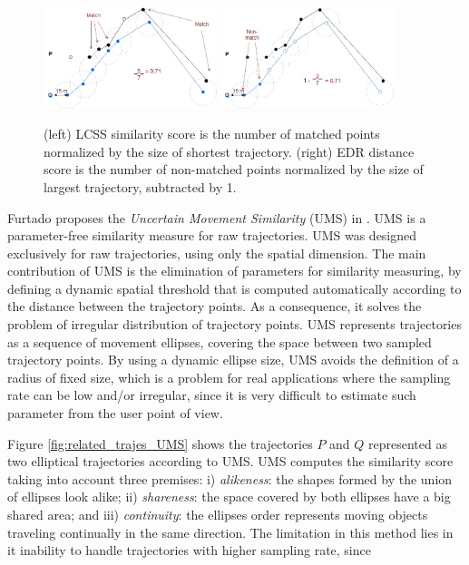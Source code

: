 \documentclass[12pt]{article}
\begin{document}
\begin{figure}[h]
\centering
\includegraphics[width=0.45\textwidth]{Related_Works/related_trajes-LCSS.jpg}
\includegraphics[width=0.45\textwidth]{Related_Works/related_trajes-EDR.jpg}
\caption{\label{fig:related_trajes_EDR_LCSS}(left) LCSS similarity score is the number of matched points normalized by the size of shortest trajectory. (right) EDR distance score is the number of non-matched points normalized by the size of largest trajectory, subtracted by 1.}
\end{figure}

Furtado proposes the \emph{Uncertain Movement Similarity} (UMS) in \cite{Furtado-UMS-2018}. UMS is a parameter-free similarity measure for raw trajectories. UMS was designed exclusively for raw trajectories, using only the spatial dimension. The main contribution of UMS is the elimination of parameters for similarity measuring, by defining a dynamic spatial threshold that is computed automatically according to the distance between the trajectory points. As a consequence, it solves the problem of irregular distribution of trajectory points. UMS represents trajectories as a sequence of movement ellipses, covering the space between two sampled trajectory points.
By using a dynamic ellipse size,  UMS avoids the definition of a radius of fixed size, which is a problem for real applications where the sampling rate can be low and/or irregular, since it is very difficult to estimate such parameter from the user point of view.

Figure \ref{fig:related_trajes_UMS} shows the trajectories $P$ and $Q$ represented as two elliptical trajectories according to UMS. UMS computes the similarity score taking into account three premises: i) \textit{alikeness}: the shapes formed by the union of ellipses look alike; ii) \textit{shareness}: the space covered by both ellipses have a {big shared} area; and iii) \textit{continuity}: the ellipses order represents moving objects traveling continually in the same direction. The limitation in this method lies in it inability to handle trajectories with higher sampling rate, since 
\end{document}
